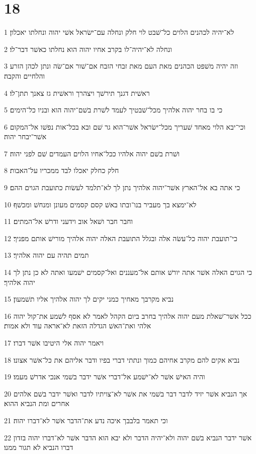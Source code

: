 \chapter{18}

\par 1 לא־יהיה לכהנים הלוים כל־שׁבט לוי חלק ונחלה עם־ישׂראל אשׁי יהוה ונחלתו יאכלון׃
\par 2 ונחלה לא־יהיה־לו בקרב אחיו יהוה הוא נחלתו כאשׁר דבר־לו׃
\par 3 וזה יהיה משׁפט הכהנים מאת העם מאת זבחי הזבח אם־שׁור אם־שׂה ונתן לכהן הזרע והלחיים והקבה׃
\par 4 ראשׁית דגנך תירשׁך ויצהרך וראשׁית גז צאנך תתן־לו׃
\par 5 כי בו בחר יהוה אלהיך מכל־שׁבטיך לעמד לשׁרת בשׁם־יהוה הוא ובניו כל־הימים׃
\par 6 וכי־יבא הלוי מאחד שׁעריך מכל־ישׂראל אשׁר־הוא גר שׁם ובא בכל־אות נפשׁו אל־המקום אשׁר־יבחר יהוה׃
\par 7 ושׁרת בשׁם יהוה אלהיו ככל־אחיו הלוים העמדים שׁם לפני יהוה׃
\par 8 חלק כחלק יאכלו לבד ממכריו על־האבות׃
\par 9 כי אתה בא אל־הארץ אשׁר־יהוה אלהיך נתן לך לא־תלמד לעשׂות כתועבת הגוים ההם׃
\par 10 לא־ימצא בך מעביר בנו־ובתו באשׁ קסם קסמים מעונן ומנחשׁ ומכשׁף׃
\par 11 וחבר חבר ושׁאל אוב וידעני ודרשׁ אל־המתים׃
\par 12 כי־תועבת יהוה כל־עשׂה אלה ובגלל התועבת האלה יהוה אלהיך מורישׁ אותם מפניך׃
\par 13 תמים תהיה עם יהוה אלהיך׃
\par 14 כי הגוים האלה אשׁר אתה יורשׁ אותם אל־מעננים ואל־קסמים ישׁמעו ואתה לא כן נתן לך יהוה אלהיך׃
\par 15 נביא מקרבך מאחיך כמני יקים לך יהוה אלהיך אליו תשׁמעון׃
\par 16 ככל אשׁר־שׁאלת מעם יהוה אלהיך בחרב ביום הקהל לאמר לא אסף לשׁמע את־קול יהוה אלהי ואת־האשׁ הגדלה הזאת לא־אראה עוד ולא אמות׃
\par 17 ויאמר יהוה אלי היטיבו אשׁר דברו׃
\par 18 נביא אקים להם מקרב אחיהם כמוך ונתתי דברי בפיו ודבר אליהם את כל־אשׁר אצונו׃
\par 19 והיה האישׁ אשׁר לא־ישׁמע אל־דברי אשׁר ידבר בשׁמי אנכי אדרשׁ מעמו׃
\par 20 אך הנביא אשׁר יזיד לדבר דבר בשׁמי את אשׁר לא־צויתיו לדבר ואשׁר ידבר בשׁם אלהים אחרים ומת הנביא ההוא׃
\par 21 וכי תאמר בלבבך איכה נדע את־הדבר אשׁר לא־דברו יהוה׃
\par 22 אשׁר ידבר הנביא בשׁם יהוה ולא־יהיה הדבר ולא יבא הוא הדבר אשׁר לא־דברו יהוה בזדון דברו הנביא לא תגור ממנו׃


